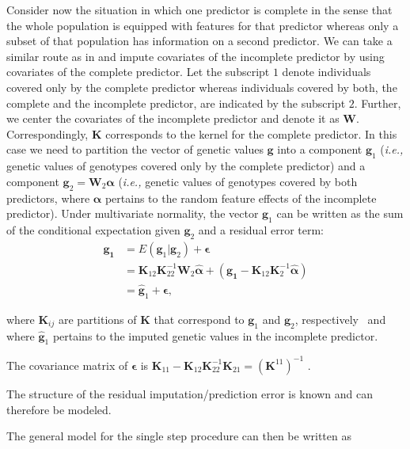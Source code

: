 \documentclass[12pt,titlepage]{article}
\begin{document}
Consider now the situation in which one predictor is complete in the sense that
the whole population is equipped with features for that predictor whereas only
a subset of that population has information on a second predictor.
We can take a similar route as in  and impute covariates 
of the incomplete predictor by using covariates of the complete predictor.
Let the subscript $1$ denote individuals covered only by the complete
predictor whereas individuals covered by both, the complete and the
incomplete predictor, are indicated by the subscript $2$.
Further, we center the covariates of the incomplete predictor and denote it as
$\mathbf{W}$.
Correspondingly, $\mathbf{K}$ corresponds to the kernel for the complete
predictor.
In this case we need to partition the vector of genetic values $\mathbf{g}$
into a component $\mathbf{g}_{1}$ (\textit{i.e.,} genetic values of genotypes
covered only by the complete predictor) and a component
$\mathbf{g}_{2} = \mathbf{W}_{2}\boldsymbol{\alpha}$ (\textit{i.e.,} genetic
values of genotypes covered by both predictors, where $\boldsymbol{\alpha}$
pertains to the random feature effects of the incomplete predictor).
Under multivariate normality, the vector $\mathbf{g}_1$ can be written as the
sum of the conditional expectation given $\mathbf{g}_2$ and a residual error
term:
\begin{align} \label{eq:mrna1}
	\mathbf{g_1} &= E(\mathbf{g}_1|\mathbf{g}_2) + \boldsymbol{\epsilon} \\
	&= \mathbf{K}_{12}\mathbf{K}^{-1}_{22}\mathbf{W}_{2}
	\boldsymbol{\hat{\alpha}} + (\mathbf{g_1} - \mathbf{K}_{12}
	\mathbf{K}^{-1}_{2}
	\boldsymbol{\hat{\alpha}}) \\
	&= \mathbf{\hat{g}}_1 + \boldsymbol{\epsilon},
\end{align}

where $\mathbf{K}_{ij}$ are partitions of $\mathbf{K}$ that correspond to 
$\mathbf{g}_{1}$ and $\mathbf{g}_{2}$, respectively~\cite{Fernando2014} and
where $\mathbf{\hat{g}}_{1}$ pertains to the imputed genetic values in the
incomplete predictor.

The covariance matrix of $\boldsymbol{\epsilon}$ is $\mathbf{K}_{11} -
\mathbf{K}_{12}\mathbf{K}^{-1}_{22}\mathbf{K}_{21} =
(\mathbf{K}^{11})^{-1}$
\cite{Legarra2009}.

The structure of the residual imputation/prediction error is known and can 
therefore be modeled.

The general model for the single step procedure can then be written as 
\end{document}
